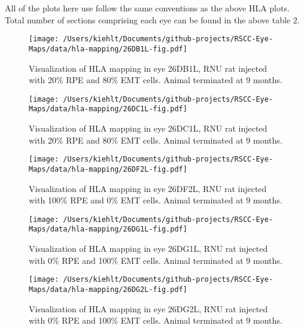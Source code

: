 \documentclass{article}
\begin{document}
All of the plots here use follow the same conventions as the above HLA plots. Total number of sections comprising each eye can be found in the above table 2.

\begin{center}
\begin{figure}
\texttt{[image: /Users/kiehlt/Documents/github-projects/RSCC-Eye-Maps/data/hla-mapping/26DB1L-fig.pdf]}
\caption{Visualization of HLA mapping in eye 26DB1L, RNU rat  injected with 20\% RPE and 80\% EMT cells. Animal terminated at 9 months.}
\label{fig:26DB1L}
\end{figure}

\end{center}
\begin{center}
\begin{figure}
\texttt{[image: /Users/kiehlt/Documents/github-projects/RSCC-Eye-Maps/data/hla-mapping/26DC1L-fig.pdf]}
\caption{Visualization of HLA mapping in eye 26DC1L, RNU rat injected with 20\% RPE and 80\% EMT cells. Animal terminated at 9 months.}
\label{fig:26DC1L}
\end{figure}

\end{center}
\begin{center}
\begin{figure}
\texttt{[image: /Users/kiehlt/Documents/github-projects/RSCC-Eye-Maps/data/hla-mapping/26DF2L-fig.pdf]}
\caption{Visualization of HLA mapping in eye 26DF2L, RNU rat injected with 100\% RPE and 0\% EMT cells. Animal terminated at 9 months.}
\label{fig:26DF2L}
\end{figure}

\end{center}
\begin{center}
\begin{figure}
\texttt{[image: /Users/kiehlt/Documents/github-projects/RSCC-Eye-Maps/data/hla-mapping/26DG1L-fig.pdf]}
\caption{Visualization of HLA mapping in eye 26DG1L, RNU rat injected with 0\% RPE and 100\% EMT cells. Animal terminated at 9 months.}
\label{fig:26DG1L}
\end{figure}

\end{center}
\begin{center}
\begin{figure}
\texttt{[image: /Users/kiehlt/Documents/github-projects/RSCC-Eye-Maps/data/hla-mapping/26DG2L-fig.pdf]}
\caption{Visualization of HLA mapping in eye 26DG2L, RNU rat injected with 0\% RPE and 100\% EMT cells. Animal terminated at 9 months.}
\label{fig:26DG2L}
\end{figure}

\end{center}
\end{document}
